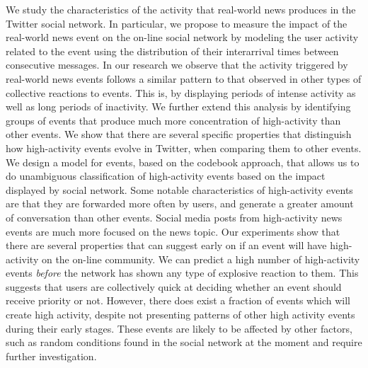 We study the characteristics of the activity that real-world news produces
in the Twitter social network. In particular, we propose to measure the impact of the
real-world news event on the on-line social network by modeling the user
activity related to the event using the distribution of their
interarrival times between consecutive messages. In our research we observe
that the activity triggered by real-world news events follows a similar
pattern to that observed in other types of collective reactions to events.
This is, by displaying periods of intense activity as well as long periods of
inactivity. We further extend this analysis by identifying groups of events
that produce much more concentration of high-activity than other events. 
We show that there are several specific properties that distinguish how
high-activity events evolve in Twitter, when comparing them to other
events. We design a model for events, based on the codebook approach, that allows us to do
unambiguous classification of high-activity events based on the impact
displayed by social network. %
Some notable
characteristics of high-activity events are that they are forwarded more
often by users, and generate a greater amount of conversation than
other events.  Social media posts from high-activity news events are
much more focused on the news topic. Our experiments show that there
are several properties that can suggest early on if an event will have
high-activity on the on-line community.  We can predict a high number of
high-activity events {\em before} the network has shown any type of
explosive reaction to them. %
This suggests that users are collectively quick at deciding whether an
event should receive priority or not.  However, there does exist a fraction of
events which will create high activity, despite not presenting
patterns of other high activity events during their early stages.  These
events are likely to be affected by other factors, such as random
conditions found in the social network at the moment and require
further investigation.
